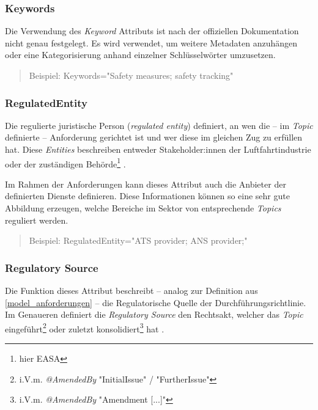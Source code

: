 \subsubsection{Keywords}

    Die Verwendung des \textit{Keyword} Attributs ist nach der offiziellen Dokumentation nicht genau festgelegt.
    Es wird verwendet, um weitere Metadaten anzuhängen oder eine Kategorisierung anhand einzelner Schlüsselwörter umzusetzen.
    \cite[23--26]{easa_xml_doc}
    \begin{quote}
        Beispiel:
        \textsf{Keywords="{}Safety measures; safety tracking"}
    \end{quote}

\subsubsection{RegulatedEntity}

    Die regulierte juristische Person (\textit{regulated entity}) definiert, an wen die -- im \textit{Topic} definierte -- Anforderung gerichtet ist und wer diese im gleichen Zug zu erfüllen hat.
    Diese \textit{Entities} beschreiben entweder Stakeholder:innen der Luftfahrtindustrie oder der zuständigen Behörde\footnote{hier \ac{EASA}} \cite[26]{easa_xml_doc}.
    
    \medskip
    Im Rahmen der \atmans Anforderungen kann dieses Attribut auch die Anbieter der definierten \atmans Dienste definieren.
    Diese Informationen können so eine sehr gute Abbildung erzeugen, welche Bereiche im \atmans Sektor von entsprechende \textit{Topics} reguliert werden.  
        \begin{quote}
        Beispiel:
        \textsf{RegulatedEntity="{}ATS provider; ANS provider;"}
    \end{quote}
    
    
\subsubsection{Regulatory Source}

    Die Funktion dieses Attribut beschreibt -- analog zur Definition aus \ref{model_anforderungen} -- die Regulatorische Quelle der Durchführungsrichtlinie.
    Im Genaueren definiert die \textit{Regulatory Source} den Rechtsakt, welcher das \textit{Topic} eingeführt\footnote{i.V.m. \textit{@AmendedBy} \textsf{"{}InitialIssue"} / "FurtherIssue"} oder zuletzt konsolidiert\footnote{i.V.m. \textit{@AmendedBy} \textsf{"{}Amendment [...]"}} hat \cite[27]{easa_xml_doc}. 
    
